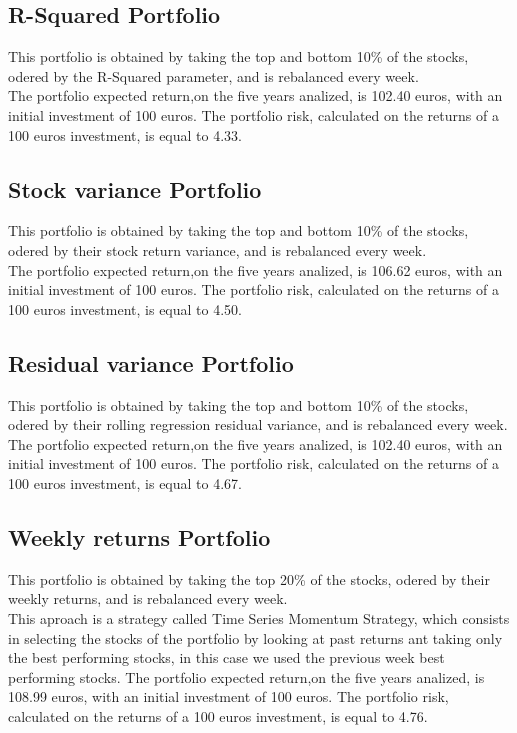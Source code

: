 \documentclass[12pt, a4paper, twocolumn]{article} %
\begin{document}
	\subsection{R-Squared Portfolio}
	This portfolio is obtained by taking the top and bottom 10\% of the stocks, odered by the R-Squared parameter, and is rebalanced every week.\\
	The portfolio expected return,on the five years analized, is 102.40 euros, with an initial investment of 100 euros. The portfolio risk, calculated on the returns of a 100 euros investment, is equal to 4.33.
	\subsection{Stock variance Portfolio}
	This portfolio is obtained by taking the top and bottom 10\% of the stocks, odered by their stock return variance, and is rebalanced every week.\\
	The portfolio expected return,on the five years analized, is 106.62 euros, with an initial investment of 100 euros. The portfolio risk, calculated on the returns of a 100 euros investment, is equal to 4.50.
	\subsection{Residual variance Portfolio}
	This portfolio is obtained by taking the top and bottom 10\% of the stocks, odered by their rolling regression residual variance, and is rebalanced every week.\\
	The portfolio expected return,on the five years analized, is 102.40 euros, with an initial investment of 100 euros. The portfolio risk, calculated on the returns of a 100 euros investment, is equal to 4.67.
	\subsection{Weekly returns Portfolio}
	This portfolio is obtained by taking the top 20\% of the stocks, odered by their weekly returns, and is rebalanced every week.\\
	This aproach is a strategy called Time Series Momentum Strategy, which consists in selecting the stocks of the portfolio by looking at past returns ant taking only the best performing stocks, in this case we used the previous week best performing stocks.
	The portfolio expected return,on the five years analized, is 108.99 euros, with an initial investment of 100 euros. The portfolio risk, calculated on the returns of a 100 euros investment, is equal to 4.76.
\end{document}
